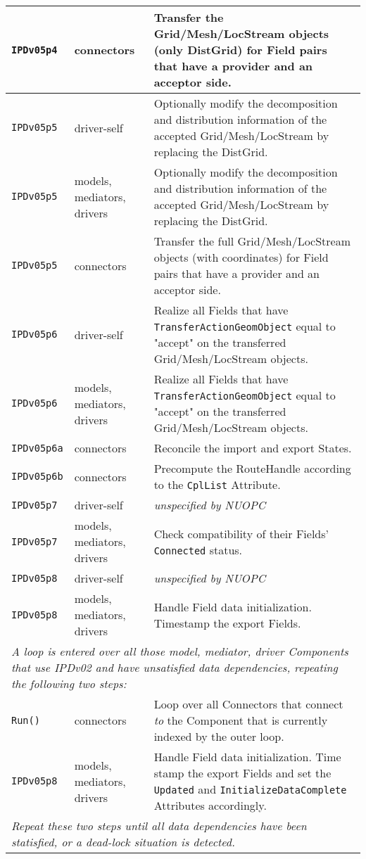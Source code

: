 \begin{longtable}[h]{|p{35mm}|p{4cm}|p{6cm}|}
     {\tt IPDv05p4}   & connectors                  & Transfer the Grid/Mesh/LocStream objects (only DistGrid) for Field pairs that have a provider and an acceptor side.\\ \hline
     {\tt IPDv05p5}   & driver-self                 & Optionally modify the decomposition and distribution information of the accepted Grid/Mesh/LocStream by replacing the DistGrid.\\ \hline
     {\tt IPDv05p5}   & models, mediators, drivers  & Optionally modify the decomposition and distribution information of the accepted Grid/Mesh/LocStream by replacing the DistGrid.\\ \hline
     {\tt IPDv05p5}   & connectors                  & Transfer the full Grid/Mesh/LocStream objects (with coordinates) for Field pairs that have a provider and an acceptor side.\\ \hline
     {\tt IPDv05p6}   & driver-self                 & Realize all Fields that have {\tt TransferActionGeomObject} equal to "accept" on the transferred Grid/Mesh/LocStream objects.\\ \hline
     {\tt IPDv05p6}   & models, mediators, drivers  & Realize all Fields that have {\tt TransferActionGeomObject} equal to "accept" on the transferred Grid/Mesh/LocStream objects.\\ \hline
     {\tt IPDv05p6a}  & connectors                  & Reconcile the import and export States.\\ \hline
     {\tt IPDv05p6b}  & connectors                  & Precompute the RouteHandle according to the {\tt CplList} Attribute.\\ \hline
     {\tt IPDv05p7}   & driver-self                 & {\em unspecified by NUOPC}\\ \hline
     {\tt IPDv05p7}   & models, mediators, drivers  & Check compatibility of their Fields' {\tt Connected} status.\\ \hline
     {\tt IPDv05p8}   & driver-self                 & {\em unspecified by NUOPC}\\ \hline
     {\tt IPDv05p8}   & models, mediators, drivers  & Handle Field data initialization. Timestamp the export Fields.\\ \hline
     \multicolumn{3}{|p{13.5cm}|}{\it A loop is entered over all those model, mediator, driver Components that use IPDv02 and have
     unsatisfied data dependencies, repeating the following two steps:}\\ \hline
     {\tt Run()}      & connectors                  & Loop over all Connectors that connect {\it to} the Component that is currently indexed by the outer loop.\\ \hline
     {\tt IPDv05p8}   & models, mediators, drivers  & Handle Field data initialization. Time stamp the export Fields and set the {\tt Updated} and {\tt InitializeDataComplete} Attributes accordingly.\\ \hline
     \multicolumn{3}{|p{13.5cm}|}{\it Repeat these two steps until all data
     dependencies have been statisfied, or a dead-lock situation is detected.}\\ 
     \hline\hline
\end{longtable}
